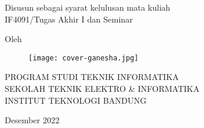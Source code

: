 \clearpage
\pagestyle{empty}

\begin{center}
    \smallskip

    \Large \bfseries \MakeUppercase{\thetitle}
    \vfill

    \subtitle
    \vfill

    \large Disusun sebagai syarat kelulusan mata kuliah \\
    IF4091/Tugas Akhir I dan Seminar
    \vfill

    \large Oleh

    \Large \theauthor

    \vfill
    \begin{figure}[h]
        \centering
        \texttt{[image: cover-ganesha.jpg]}
    \end{figure}
    \vfill

    \large
    \uppercase{
        Program Studi Teknik Informatika \\
        Sekolah Teknik Elektro \& Informatika \\
        Institut Teknologi Bandung
    }

    Desember 2022

\end{center}

\clearpage
